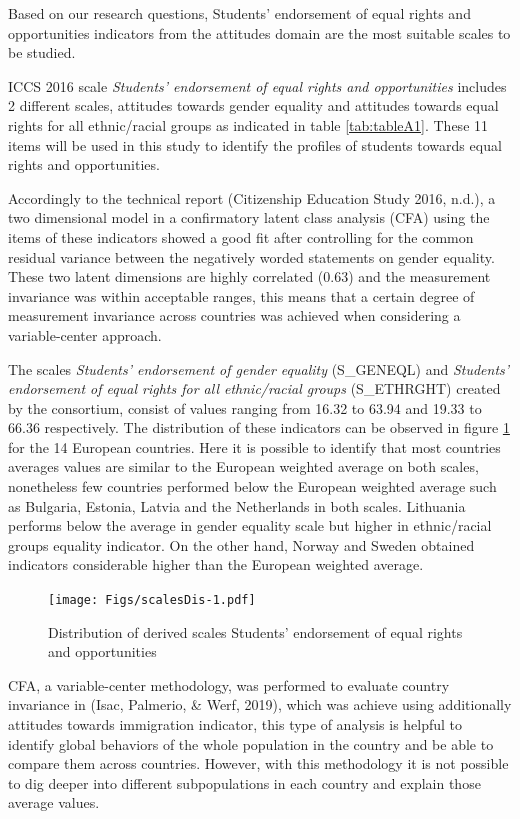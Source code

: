 \documentclass[12pt,a4paper,oneside]{reedthesis}
\begin{document}
Based on our research questions, Students' endorsement of equal rights and opportunities indicators from the attitudes domain are the most suitable scales to be studied.

ICCS 2016 scale \emph{Students' endorsement of equal rights and opportunities} includes 2 different scales, attitudes towards gender equality and attitudes towards equal rights for all ethnic/racial groups as indicated in table \ref{tab:tableA1}.
These 11 items will be used in this study to identify the profiles of students towards equal rights and opportunities.

Accordingly to the technical report (Citizenship Education Study 2016, n.d.), a two dimensional model in a confirmatory latent class analysis (CFA) using the items of these indicators showed a good fit after controlling for the common residual variance between the negatively worded statements on gender equality. These two latent dimensions are highly correlated (0.63) and the measurement invariance was within acceptable ranges, this means that a certain degree of measurement invariance across countries was achieved when considering a variable-center approach.

The scales \emph{Students' endorsement of gender equality} (S\_GENEQL) and \emph{Students' endorsement of equal rights for all ethnic/racial groups} (S\_ETHRGHT) created by the consortium, consist of values ranging from 16.32 to 63.94 and 19.33 to 66.36 respectively. The distribution of these indicators can be observed in figure \ref{fig:scalesDis} for the 14 European countries. Here it is possible to identify that most countries averages values are similar to the European weighted average on both scales, nonetheless few countries performed below the European weighted average such as Bulgaria, Estonia, Latvia and the Netherlands in both scales. Lithuania performs below the average in gender equality scale but higher in ethnic/racial groups equality indicator. On the other hand, Norway and Sweden obtained indicators considerable higher than the European weighted average.
\begin{figure}
\centering
\texttt{[image: Figs/scalesDis-1.pdf]}
\caption{\label{fig:scalesDis}Distribution of derived scales Students' endorsement of equal rights and opportunities}
\end{figure}
CFA, a variable-center methodology, was performed to evaluate country invariance in (Isac, Palmerio, \& Werf, 2019), which was achieve using additionally attitudes towards immigration indicator, this type of analysis is helpful to identify global behaviors of the whole population in the country and be able to compare them across countries. However, with this methodology it is not possible to dig deeper into different subpopulations in each country and explain those average values.
\end{document}
